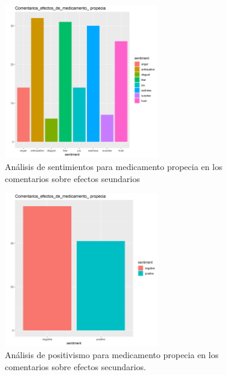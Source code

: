 \documentclass[spanish,]{article}
\begin{document}
\begin{figure}[h]
    \centering
    \includegraphics[width=0.6\textwidth]{figuras/sentimientos/Bpropecia1.png}
    \caption{Análisis de sentimientos para medicamento propecia en los comentarios sobre efectos seundarios}
    \label{fig:sentimientos:345}
\end{figure}

\begin{figure}[h]
    \centering
    \includegraphics[width=0.6\textwidth]{figuras/sentimientos/Bpropecia2.png}
    \caption{Análisis de positivismo para medicamento propecia en los comentarios sobre efectos secundarios.}
    \label{fig:sentimientos:35}
\end{figure}
\end{document}
